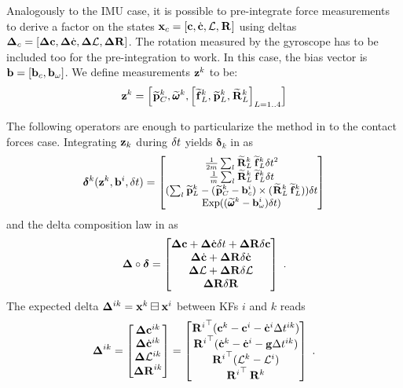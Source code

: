Analogously to the IMU case, it is possible to pre-integrate force measurements to derive a factor on the states 
${\bf x}_c=[{\bf c}, \dot{{\bf c}}, \mathcal{L}, \prescript{}{}{{\bf R}}_{}]$ using deltas ${{\bm \Delta}}_c=[{{\bm \Delta}}{\bf c}, {{\bm \Delta}}\dot{{\bf c}}, {{\bm \Delta}}\mathcal{L}, {\bm \Delta {\bf R}}]$. 
The rotation measured by the gyroscope has to be included too for the pre-integration to work. 
In this case, the bias vector is ${\bf b} = [{\bf b}_c, {\bf b}_{\omega}]$. We define measurements  ${\bf z}^k$ to be:
%
\begin{equation}
    {\bf z}^k = \left[ \prescript{}{}{\widetilde{{\bf p}}}_{C}^k, \prescript{}{}{\widetilde{\pmb{\omega}}}_{}^k, \left[\prescript{}{}{\widetilde{{\bf f}}}_{L}^k, \prescript{}{}{\widetilde{{\bf p}}}_{L}^k, \prescript{}{}{\widetilde{{\bf R}}}_{L}^k \right]_{L=1..4}\right]
\end{equation}

The following operators are enough to particularize the  method in  to the contact forces case.
Integrating ${\bf z}_k$ during $\delta t$ yields $\bm\delta_k$ in  as
%
\begin{equation}
    \small
        \bm\delta^{k}({\bf z}^k, {\bf b}^i, \delta t) =
        \begin{bmatrix}
        \frac{1}{2m} \sum_l \prescript{}{}{\widetilde{{\bf R}}}_{L}^k \prescript{}{}{\widetilde{{\bf f}}}_{L}^k \delta t^2
        \\
        \frac{1}{m} \sum_l \prescript{}{}{\widetilde{{\bf R}}}_{L}^k \prescript{}{}{\widetilde{{\bf f}}}_{L}^k \delta t 
        \\
        (\sum_l \prescript{}{}{\widetilde{{\bf p}}}_{L}^k - (\prescript{}{}{\widetilde{{\bf p}}}_{C}^k - {\bf b}_c^i) \times (\prescript{}{}{\widetilde{{\bf R}}}_{L}^k \prescript{}{}{\widetilde{{\bf f}}}_{L}^k ))\delta t
        \\
        \operatorname*{Exp}((\prescript{}{}{\widetilde{\pmb{\omega}}}_{}^k - {\bf b}_{\omega}^i)\delta t)
        \end{bmatrix}
    \normalsize
\end{equation}
%
and the delta composition law in  as
%
\begin{equation}
    \D \circ \bm\delta = 
    \begin{bmatrix}
    \D\COM + \D\COMd \dt + \DR  \delta\COM
    \\
    \D\COMd + \DR  \delta \COMd
    \\
    \D\AM + \DR  \delta \AM
    \\
    \DR\dR
    \end{bmatrix}
    ~.
    \label{eq:DeltaDTCompo}
\end{equation}
%
The expected delta ${{\bm \Delta}}^{ik}={\bf x}^k\boxminus{\bf x}^i$ between KFs $i$ and $k$ reads
%
\begin{equation}
    {{\bm \Delta}}^{ik} =
    \begin{bmatrix}
    {{\bm \Delta}}{\bf c}^{ik} \\ {{\bm \Delta}}\dot{{\bf c}}^{ik} \\ {{\bm \Delta}}\mathcal{L}^{ik} \\ {\bm \Delta {\bf R}}^{ik}
    \end{bmatrix}
    =
    \begin{bmatrix}
        {\prescript{}{}{{\bf R}}_{}^i}^{\top} ({\bf c}^k - {\bf c}^i - \dot{{\bf c}}^i \Delta t^{ik})
        \\
        {\prescript{}{}{{\bf R}}_{}^i}^{\top} (\dot{{\bf c}}^{k} - \dot{{\bf c}}^{i} - {\bf g} \Delta t^{ik})
        \\
        {\prescript{}{}{{\bf R}}_{}^i}^{\top} (\mathcal{L}^{k} - \mathcal{L}^{i})
        \\
        {\prescript{}{}{{\bf R}}_{}^i}^{\top} \prescript{}{}{{\bf R}}_{}^k
    \end{bmatrix}~.
\end{equation}

